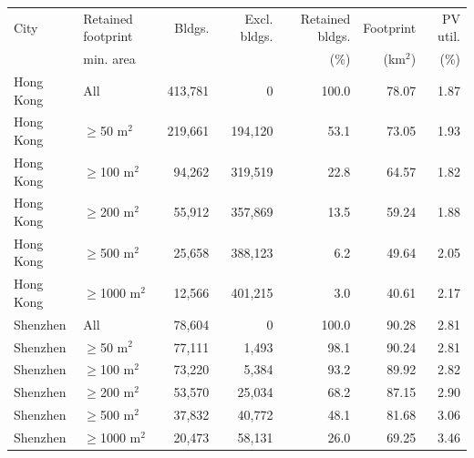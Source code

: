 \begin{tabular}{@{}llrrrrr@{}}
\toprule
City & Retained footprint & Bldgs. & Excl. bldgs. & Retained bldgs. & Footprint & PV util. \\
 & min. area & & & (\%) & (km$^2$) & (\%) \\
\midrule
Hong Kong & All & 413,781 & 0 & 100.0 & 78.07 & 1.87 \\
Hong Kong & $\ge$50 m$^2$ & 219,661 & 194,120 & 53.1 & 73.05 & 1.93 \\
Hong Kong & $\ge$100 m$^2$ & 94,262 & 319,519 & 22.8 & 64.57 & 1.82 \\
Hong Kong & $\ge$200 m$^2$ & 55,912 & 357,869 & 13.5 & 59.24 & 1.88 \\
Hong Kong & $\ge$500 m$^2$ & 25,658 & 388,123 & 6.2 & 49.64 & 2.05 \\
Hong Kong & $\ge$1000 m$^2$ & 12,566 & 401,215 & 3.0 & 40.61 & 2.17 \\
Shenzhen & All & 78,604 & 0 & 100.0 & 90.28 & 2.81 \\
Shenzhen & $\ge$50 m$^2$ & 77,111 & 1,493 & 98.1 & 90.24 & 2.81 \\
Shenzhen & $\ge$100 m$^2$ & 73,220 & 5,384 & 93.2 & 89.92 & 2.82 \\
Shenzhen & $\ge$200 m$^2$ & 53,570 & 25,034 & 68.2 & 87.15 & 2.90 \\
Shenzhen & $\ge$500 m$^2$ & 37,832 & 40,772 & 48.1 & 81.68 & 3.06 \\
Shenzhen & $\ge$1000 m$^2$ & 20,473 & 58,131 & 26.0 & 69.25 & 3.46 \\
\bottomrule
\end{tabular}
